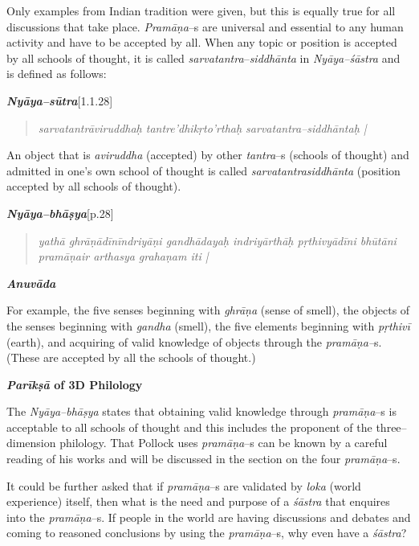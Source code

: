 Only examples from Indian tradition were given, but this is equally true for all discussions that take place. \textit{Pramāṇa}–s are universal and essential to any human activity and have to be accepted by all. When any topic or position is accepted by all schools of thought, it is called \textit{sarvatantra}–\textit{siddhānta} in \textit{Nyāya–śāstra} and is defined as follows:

\textit{\textbf{Nyāya–sūtra}}[1.1.28]

\begin{verse}
\textit{sarvatantrāviruddhaḥ tantre'dhikṛto'rthaḥ sarvatantra–siddhāntaḥ |}
\end{verse}

An object that is \textit{aviruddha} (accepted) by other \textit{tantra}–s (schools of thought) and admitted in one's own school of thought is called \textit{sarvatantrasiddhānta} (position accepted by all schools of thought).

\textit{\textbf{Nyāya–bhāṣya}}[p.28]

\begin{verse}
\textit{yathā ghrāṇādīnīndriyāṇi gandhādayaḥ indriyārthāḥ pṛthivyādīni bhūtāni pramāṇair arthasya grahaṇam iti |}
\end{verse}

\textit{\textbf{Anuvāda}}

For example, the five senses beginning with \textit{ghrāṇa }(sense of smell), the objects of the senses beginning with \textit{gandha }(smell), the five elements beginning with \textit{pṛthivī} (earth), and acquiring of valid knowledge of objects through the \textit{pramāṇa–}s. (These are accepted by all the schools of thought.)

\textbf{\textit{Parīkṣā} of 3D Philology}

The \textit{Nyāya–bhāṣya} states that obtaining valid knowledge through \textit{pramāṇa}–s is acceptable to all schools of thought and this includes the proponent of the three–dimension philology. That Pollock uses \textit{pramāṇa}–s can be known by a careful reading of his works and will be discussed in the section on the four \textit{pramāṇa}–s.

It could be further asked that if \textit{pramāṇa}–s are validated by \textit{loka} (world experience) itself, then what is the need and purpose of a \textit{śāstra} that enquires into the \textit{pramāṇa}–s. If people in the world are having discussions and debates and coming to reasoned conclusions by using the \textit{pramāṇa}–s, why even have a \textit{śāstra}?

